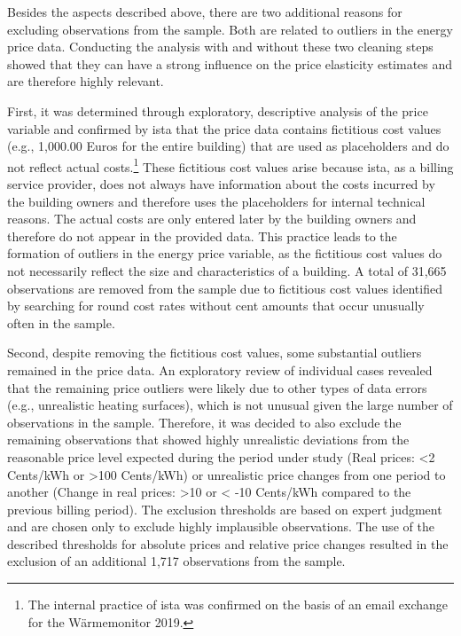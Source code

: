 \documentclass[12pt,twoside]{reedthesis}
\begin{document}
Besides the aspects described above, there are two additional reasons for excluding observations from the sample. Both are related to outliers in the energy price data. Conducting the analysis with and without these two cleaning steps showed that they can have a strong influence on the price elasticity estimates and are therefore highly relevant.

First, it was determined through exploratory, descriptive analysis of the price variable and confirmed by ista that the price data contains fictitious cost values (e.g., 1,000.00 Euros for the entire building) that are used as placeholders and do not reflect actual costs.\footnote{The internal practice of ista was confirmed on the basis of an email exchange for the Wärmemonitor 2019.} These fictitious cost values arise because ista, as a billing service provider, does not always have information about the costs incurred by the building owners and therefore uses the placeholders for internal technical reasons. The actual costs are only entered later by the building owners and therefore do not appear in the provided data. This practice leads to the formation of outliers in the energy price variable, as the fictitious cost values do not necessarily reflect the size and characteristics of a building. A total of 31,665 observations are removed from the sample due to fictitious cost values identified by searching for round cost rates without cent amounts that occur unusually often in the sample.

Second, despite removing the fictitious cost values, some substantial outliers remained in the price data. An exploratory review of individual cases revealed that the remaining price outliers were likely due to other types of data errors (e.g., unrealistic heating surfaces), which is not unusual given the large number of observations in the sample. Therefore, it was decided to also exclude the remaining observations that showed highly unrealistic deviations from the reasonable price level expected during the period under study (Real prices: \textless2 Cents/kWh or \textgreater100 Cents/kWh) or unrealistic price changes from one period to another (Change in real prices: \textgreater10 or \textless{} -10 Cents/kWh compared to the previous billing period). The exclusion thresholds are based on expert judgment and are chosen only to exclude highly implausible observations. The use of the described thresholds for absolute prices and relative price changes resulted in the exclusion of an additional 1,717 observations from the sample.
\end{document}
